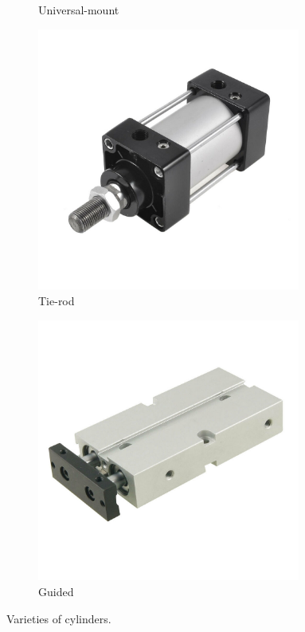 \begin{figure}[H]
\begin{subfigure}[b]{.24\linewidth}
		\caption{Universal-mount}
	\end{subfigure}
	\begin{subfigure}[b]{.24\linewidth}
		\includegraphics[width=0.95\textwidth]{imgs/piston_tierod.jpeg}
		\caption{Tie-rod}
	\end{subfigure}
	\begin{subfigure}[b]{.24\linewidth}
		\includegraphics[width=0.95\textwidth]{imgs/piston_stage.jpeg}
		\caption{Guided}
	\end{subfigure}
	
	\caption{Varieties of cylinders.}
\end{figure}
